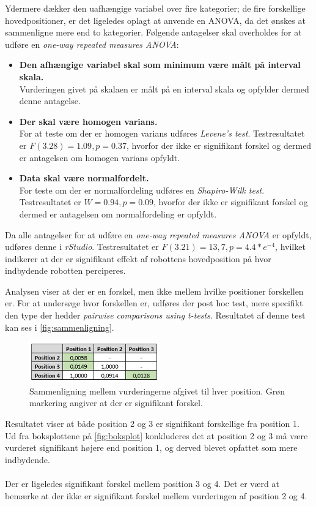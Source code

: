 Ydermere dækker den uafhængige variabel over fire kategorier; de fire forskellige hovedpositioner, er det ligeledes oplagt at anvende en ANOVA, da det ønskes at sammenligne mere end to kategorier.\blankline
%
Følgende antagelser skal overholdes for at udføre en \textit{one-way repeated measures ANOVA}: \blankline  
%
\begin{itemize}
	\item \textbf{Den afhængige variabel skal som minimum være målt på interval skala.}\\
	Vurderingen givet på skalaen er målt på en interval skala og opfylder dermed denne antagelse.
	\item \textbf{Der skal være homogen varians. }\\
	For at teste om der er homogen varians udføres \textit{Levene's test}. Testresultatet er $F(3.28)=1.09, p=0.37$, hvorfor der ikke er signifikant forskel og dermed er antagelsen om homogen varians opfyldt. 
	\item \textbf{Data skal være normalfordelt.}\\
	For teste om der er normalfordeling udføres en \textit{Shapiro-Wilk test}. Testresultatet er $W=0.94, p=0.09$, hvorfor der ikke er signifikant forskel og dermed er antagelsen om normalfordeling er opfyldt.\blankline
\end{itemize}
\noindent
%
Da alle antagelser for at udføre en \textit{one-way repeated measures ANOVA} er opfyldt, udføres denne i \textit{rStudio}. Testresultatet er $F(3.21)=13,7, p=4.4*e^{-4}$, hvilket indikerer at der er signifikant effekt af robottens hovedposition på hvor indbydende robotten perciperes.

Analysen viser at der er en forskel, men ikke mellem hvilke positioner forskellen er. For at undersøge hvor forskellen er, udføres der post hoc test, mere specifikt den type der hedder \textit{pairwise comparisons using t-tests}. Resultatet af denne test kan ses i \autoref{fig:sammenligning}.
\begin{figure}[H]
\centering
\includegraphics[width = 0.5\textwidth]{Figure/PostHocExcel.PNG} 
\caption{Sammenligning mellem vurderingerne afgivet til hver position. Grøn markering angiver at der er signifikant forskel.}
\label{fig:sammenligning}
\end{figure}

\noindent Resultatet viser at både position 2 og 3 er signifikant forskellige fra position 1. Ud fra boksplottene på \autoref{fig:boksplot} konkluderes det at position 2 og 3 må være vurderet signifikant højere end position 1, og derved blevet opfattet som mere indbydende. 
\\\\
Der er ligeledes signifikant forskel mellem position 3 og 4. Det er værd at bemærke at der ikke er signifikant forskel mellem vurderingen af position 2 og 4. 